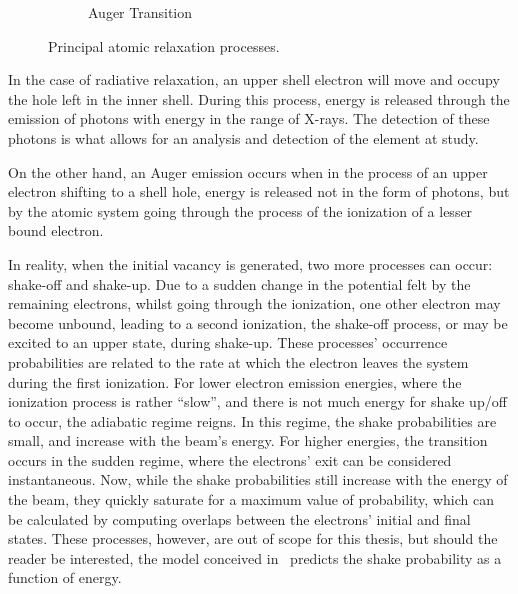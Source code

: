 \begin{figure}[h!]
\begin{subfigure}{0.49\textwidth}
        \caption{Auger Transition}
    \end{subfigure}
    \caption{Principal atomic relaxation processes.}
\end{figure}

In the case of radiative relaxation, an upper shell electron will move and occupy the hole left in the inner shell. During this process, energy is released through the emission of photons with energy in the range of X-rays. The detection of these photons is what allows for an analysis and detection of the element at study.

On the other hand, an Auger emission occurs when in the process of an upper electron shifting to a shell hole, energy is released not in the form of photons, but by the atomic system going through the process of the ionization of a lesser bound electron.


In reality, when the initial vacancy is generated, two more processes can occur: shake-off and shake-up. Due to a sudden change in the potential felt by the remaining electrons, whilst going through the ionization, one other electron may become unbound, leading to a second ionization, the shake-off process, or may be excited to an upper state, during shake-up. These processes' occurrence probabilities are related to the rate at which the electron leaves the system during the first ionization. For lower electron emission energies, where the ionization process is rather ``slow'', and there is not much energy for shake up/off to occur, the adiabatic regime reigns. In this regime, the shake probabilities are small, and increase with the beam's energy. For higher energies, the transition occurs in the sudden regime, where the electrons' exit can be considered instantaneous. Now, while the shake probabilities still increase with the energy of the beam, they quickly saturate for a maximum value of probability, which can be calculated by computing overlaps between the electrons' initial and final states. These processes, however, are out of scope for this thesis, but should the reader be interested, the model conceived in~\cite{Thomas_model} predicts the shake probability as a function of energy.

